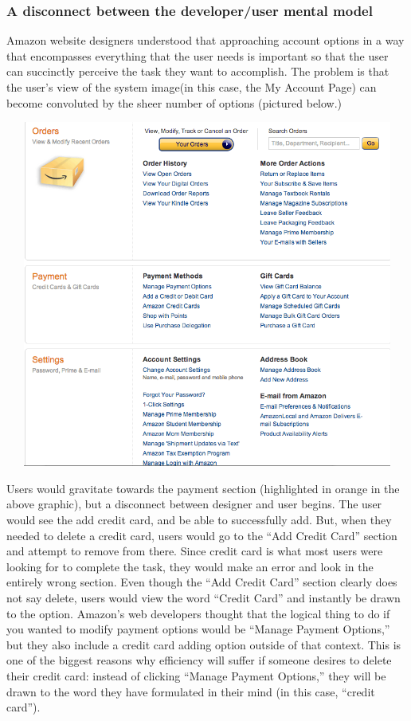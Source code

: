 \documentclass[11pt, oneside]{article}   	%
\begin{document}
\subsubsection{A disconnect between the developer/user mental model}
Amazon website designers understood that approaching account options in a way that encompasses everything that the user needs is important so that the user can succinctly perceive the task they want to accomplish. The problem is that the user's view of the system image(in this case, the My Account Page) can become convoluted by the sheer number of options (pictured below.)

\includegraphics[width=6in, height=4.5in]{Amazon2}

Users would gravitate towards the payment section (highlighted in orange in the above graphic), but a disconnect between designer and user begins. The user would see the add credit card, and be able to successfully add. But, when they needed to delete a credit card, users would go to the ``Add Credit Card'' section and attempt to remove from there. Since credit card is what most users were looking for to complete the task, they would make an error and look in the entirely wrong section. Even though the ``Add Credit Card'' section clearly does not say delete, users would view the word ``Credit Card'' and instantly be drawn to the option. Amazon's web developers thought that the logical thing to do if you wanted to modify payment options would be ``Manage Payment Options,'' but they also include a credit card adding option outside of that context. This is one of the biggest reasons why efficiency will suffer if someone desires to delete their credit card: instead of clicking ``Manage Payment Options,'' they will be drawn to the word they have formulated in their mind (in this case, ``credit card'').
\end{document}
